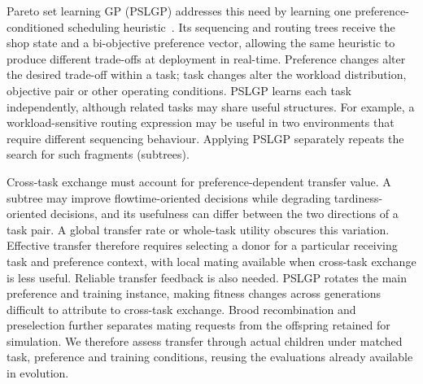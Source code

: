 \documentclass[10pt,journal]{IEEEtran}
\begin{document}
Pareto set learning GP (PSLGP) addresses this need by learning one preference-conditioned scheduling heuristic~\cite{xu2026pslgp}. Its sequencing and routing trees receive the shop state and a bi-objective preference vector, allowing the same heuristic to produce different trade-offs at deployment in real-time. Preference changes alter the desired trade-off within a task; task changes alter the workload distribution, objective pair or other operating conditions. PSLGP learns each task independently, although related tasks may share useful structures. For example, a workload-sensitive routing expression may be useful in two environments that require different sequencing behaviour. Applying PSLGP separately repeats the search for such fragments (subtrees).

Cross-task exchange must account for preference-dependent transfer value. A subtree may improve flowtime-oriented decisions while degrading tardiness-oriented decisions, and its usefulness can differ between the two directions of a task pair. A global transfer rate or whole-task utility obscures this variation. Effective transfer therefore requires selecting a donor for a particular receiving task and preference context, with local mating available when cross-task exchange is less useful. Reliable transfer feedback is also needed. PSLGP rotates the main preference and training instance, making fitness changes across generations difficult to attribute to cross-task exchange. Brood recombination \cite{liang2026evoamc} and preselection further separates mating requests from the offspring retained for simulation. We therefore assess transfer through actual children under matched task, preference and training conditions, reusing the evaluations already available in evolution.
\end{document}
